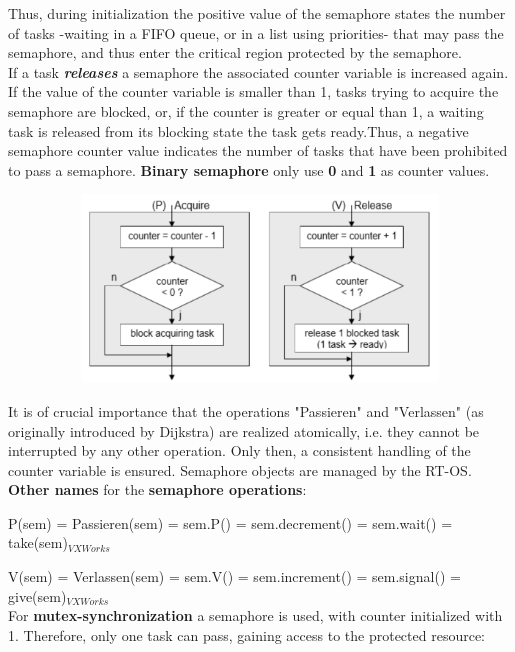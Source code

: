 Thus, during initialization the positive value of the semaphore states the number of tasks -waiting in a FIFO queue, or in a list using priorities- that may pass the semaphore, and thus enter the critical region protected by the semaphore.\\

If a task \textbf{\textit{releases}} a semaphore the associated counter variable is increased again. If the value of the counter variable is smaller than 1, tasks trying to acquire the semaphore are blocked, or, if the counter is greater or equal than 1, a waiting task is released from its blocking state  the task gets ready.Thus, a negative semaphore counter value indicates the number of tasks that have been prohibited to pass a semaphore. \textbf{Binary semaphore} only use \textbf{0} and \textbf{1} as counter values.

 	\begin{figure}[h]
    \centering
    \includegraphics[width=12cm, height=5cm]{Images/image105.png}
    \label{fig:Fig 51}
    \end{figure}

It is of crucial importance that the operations "Passieren" and "Verlassen" (as originally introduced by Dijkstra) are realized atomically, i.e. they cannot be interrupted by any other operation. Only then, a consistent handling of the counter variable is ensured. Semaphore objects are managed by the RT-OS.\\

\textbf{Other names} for the \textbf{semaphore operations}:

P(sem) = Passieren(sem) = sem.P() = sem.decrement() = sem.wait() = take(sem)${}_{VXWorks}$

V(sem) = Verlassen(sem) = sem.V() = sem.increment()  = sem.signal() = give(sem)${}_{VXWorks}$\\


For \textbf{mutex-synchronization} a semaphore is used, with counter initialized with 1. Therefore, only one task can pass, gaining access to the protected resource: 

